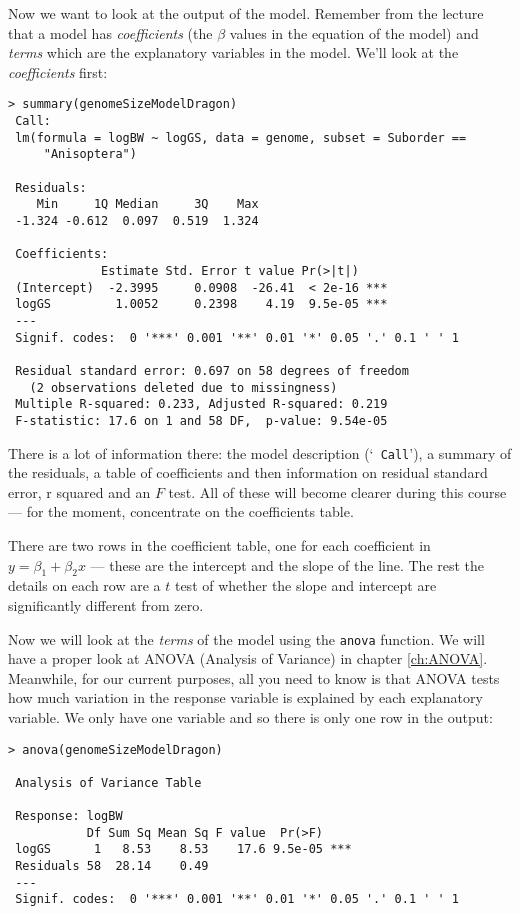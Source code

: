 Now we want to look at the output of the model. Remember from the 
lecture that a model has {\it coefficients} (the $\beta$ values in the 
equation of the model) and {\it terms} which are the explanatory 
variables in the model. We'll look at the {\it coefficients} first:

\begin{lstlisting}
> summary(genomeSizeModelDragon) 
 Call:
 lm(formula = logBW ~ logGS, data = genome, subset = Suborder == 
     "Anisoptera")
 
 Residuals:
    Min     1Q Median     3Q    Max 
 -1.324 -0.612  0.097  0.519  1.324 
 
 Coefficients:
             Estimate Std. Error t value Pr(>|t|)    
 (Intercept)  -2.3995     0.0908  -26.41  < 2e-16 ***
 logGS         1.0052     0.2398    4.19  9.5e-05 ***
 ---
 Signif. codes:  0 '***' 0.001 '**' 0.01 '*' 0.05 '.' 0.1 ' ' 1 
 
 Residual standard error: 0.697 on 58 degrees of freedom
   (2 observations deleted due to missingness)
 Multiple R-squared: 0.233,	Adjusted R-squared: 0.219 
 F-statistic: 17.6 on 1 and 58 DF,  p-value: 9.54e-05  
\end{lstlisting}

There is a lot of information there: the model description (`{\tt 
Call}'), a summary of the residuals, a table of coefficients and then 
information on residual standard error, r squared and an $F$ test. All 
of these will become clearer during this course --- for the moment, 
concentrate on the coefficients table.

There are two rows in the coefficient table, one for each coefficient 
in $y=\beta_1 + \beta_2x$ --- these are the intercept and the slope of 
the line. The rest the details on each row are a $t$ test  of whether 
the slope and intercept are significantly different from zero. 

Now we will look at the {\it terms} of the model using the {\tt anova} 
function. We will have a proper look at ANOVA (Analysis of Variance) in 
chapter \ref{ch:ANOVA}. Meanwhile, for our current purposes, all you need to 
know is that ANOVA tests how much variation in the response variable is 
explained by each explanatory variable. We only have one variable and 
so there is only one row in the output:

\begin{lstlisting}
> anova(genomeSizeModelDragon)

 Analysis of Variance Table
 
 Response: logBW
           Df Sum Sq Mean Sq F value  Pr(>F)    
 logGS      1   8.53    8.53    17.6 9.5e-05 ***
 Residuals 58  28.14    0.49                    
 ---
 Signif. codes:  0 '***' 0.001 '**' 0.01 '*' 0.05 '.' 0.1 ' ' 1 
\end{lstlisting}

